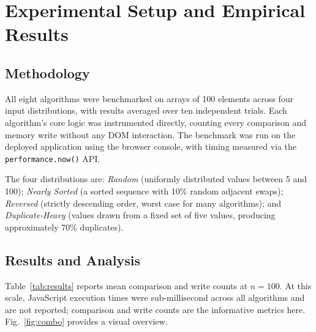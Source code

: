 \documentclass[conference]{IEEEtran}
\begin{document}
\section{Experimental Setup and Empirical Results}

\subsection{Methodology}

All eight algorithms were benchmarked on arrays of 100 elements across four
input distributions, with results averaged over ten independent trials. Each
algorithm's core logic was instrumented directly, counting every comparison and
memory write without any DOM interaction. The benchmark was run on the deployed
application using the browser console, with timing measured via the
\texttt{performance.now()} API.

The four distributions are: \emph{Random} (uniformly distributed values between
5 and 100); \emph{Nearly Sorted} (a sorted sequence with 10\% random adjacent
swaps); \emph{Reversed} (strictly descending order, worst case for many
algorithms); and \emph{Duplicate-Heavy} (values drawn from a fixed set of five
values, producing approximately 70\% duplicates).

\subsection{Results and Analysis}

Table~\ref{tab:results} reports mean comparison and write counts at $n = 100$.
At this scale, JavaScript execution times were sub-millisecond across all
algorithms and are not reported; comparison and write counts are the
informative metrics here. Fig.~\ref{fig:combo} provides a visual overview.
\end{document}
